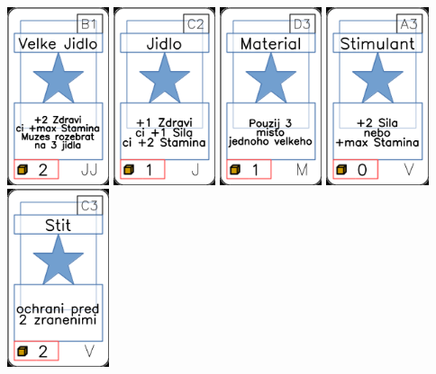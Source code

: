 \documentclass[a4paper]{article}
\begin{document}
	\includegraphics[width=3.0cm]{img-1_35}
	\includegraphics[width=3.0cm]{img-1_11}
	\includegraphics[width=3.0cm]{img-1_47}
	\includegraphics[width=3.0cm]{img-1_62}
	\includegraphics[width=3.0cm]{img-1_72}
\end{document}
